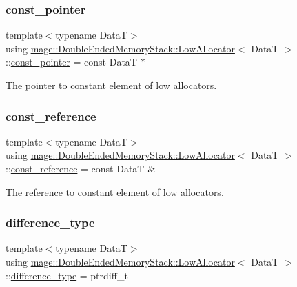 \subsubsection{\texorpdfstring{const\+\_\+pointer}{const\_pointer}}
{\footnotesize\ttfamily template$<$typename DataT$>$ \\
using \hyperlink{structmage_1_1_double_ended_memory_stack_1_1_low_allocator}{mage\+::\+Double\+Ended\+Memory\+Stack\+::\+Low\+Allocator}$<$ DataT $>$\+::\hyperlink{structmage_1_1_double_ended_memory_stack_1_1_low_allocator_a5c3c7e9fde98e421a2f22d6b7cfbc83e}{const\+\_\+pointer} =  const DataT $\ast$}

The pointer to constant element of low allocators. \hypertarget{structmage_1_1_double_ended_memory_stack_1_1_low_allocator_a08f0e62b93ff0007afdf1ee565fcd490}{}\label{structmage_1_1_double_ended_memory_stack_1_1_low_allocator_a08f0e62b93ff0007afdf1ee565fcd490} 
\subsubsection{\texorpdfstring{const\+\_\+reference}{const\_reference}}
{\footnotesize\ttfamily template$<$typename DataT$>$ \\
using \hyperlink{structmage_1_1_double_ended_memory_stack_1_1_low_allocator}{mage\+::\+Double\+Ended\+Memory\+Stack\+::\+Low\+Allocator}$<$ DataT $>$\+::\hyperlink{structmage_1_1_double_ended_memory_stack_1_1_low_allocator_a08f0e62b93ff0007afdf1ee565fcd490}{const\+\_\+reference} =  const DataT \&}

The reference to constant element of low allocators. \hypertarget{structmage_1_1_double_ended_memory_stack_1_1_low_allocator_a146f18c8e4654d7c3462c49aa87b509a}{}\label{structmage_1_1_double_ended_memory_stack_1_1_low_allocator_a146f18c8e4654d7c3462c49aa87b509a} 
\subsubsection{\texorpdfstring{difference\+\_\+type}{difference\_type}}
{\footnotesize\ttfamily template$<$typename DataT$>$ \\
using \hyperlink{structmage_1_1_double_ended_memory_stack_1_1_low_allocator}{mage\+::\+Double\+Ended\+Memory\+Stack\+::\+Low\+Allocator}$<$ DataT $>$\+::\hyperlink{structmage_1_1_double_ended_memory_stack_1_1_low_allocator_a146f18c8e4654d7c3462c49aa87b509a}{difference\+\_\+type} =  ptrdiff\+\_\+t}

